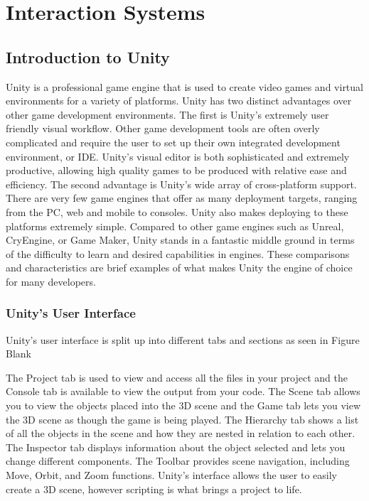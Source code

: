 \chapter{Interaction Systems}\label{interaction systems}


\section{Introduction to Unity}\label{Unity}
 
 Unity is a professional game engine that is used to create video games and virtual environments for a variety of platforms. Unity has two distinct advantages over other game development environments. The first is Unity's extremely user friendly visual workflow. Other game development tools are often overly complicated and require the user to set up their own integrated development environment, or IDE. Unity's visual editor is both sophisticated and extremely productive, allowing high quality games to be produced with relative ease and efficiency. The second advantage is Unity's wide array of cross-platform support. There are very few game engines that offer as many deployment targets, ranging from the PC, web and mobile to consoles. Unity also makes deploying to these platforms extremely simple. Compared to other game engines such as Unreal, CryEngine, or Game Maker, Unity stands in a fantastic middle ground in terms of the difficulty to learn and desired capabilities in engines. These comparisons and characteristics are brief examples of what makes Unity the engine of choice for many developers.
 
 \subsection{Unity's User Interface}
 
 Unity's user interface is split up into different tabs and sections as seen in Figure Blank
 
 
 The Project tab is used to view and access all the files in your project and the Console tab is available to view the output from your code. The Scene tab allows you to view the objects placed into the 3D scene and the Game tab lets you view the 3D scene as though the game is being played. The Hierarchy tab shows a list of all the objects in the scene and how they are nested in relation to each other. The Inspector tab displays information about the object selected and lets you change different components. The Toolbar provides scene navigation, including Move, Orbit, and Zoom functions. Unity's interface allows the user to easily create a 3D scene, however scripting is what brings a project to life. 
 
